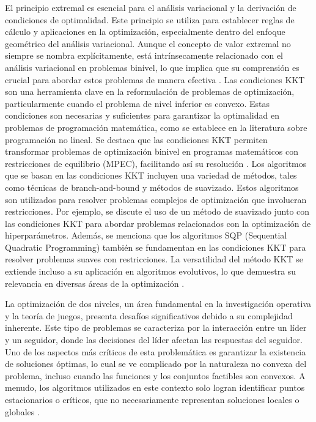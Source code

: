 El principio extremal es esencial para el análisis variacional y la derivación de condiciones de optimalidad. Este principio se utiliza para establecer reglas de cálculo y aplicaciones en la optimización, especialmente dentro del enfoque geométrico del análisis variacional. Aunque el concepto de valor extremal no siempre se nombra explícitamente, está intrínsecamente relacionado con el análisis variacional en problemas binivel, lo que implica que su comprensión es crucial para abordar estos problemas de manera efectiva \cite{DempeyZemkoho2020}.
Las condiciones KKT son una herramienta clave en la reformulación de problemas de optimización, particularmente cuando el problema de nivel inferior es convexo. Estas condiciones son necesarias y suficientes para garantizar la optimalidad en problemas de programación matemática, como se establece en la literatura sobre programación no lineal. Se destaca que las condiciones KKT permiten transformar problemas de optimización binivel en programas matemáticos con restricciones de equilibrio (MPEC), facilitando así su resolución \cite{DempeyZemkoho2020}.
Los algoritmos que se basan en las condiciones KKT incluyen una variedad de métodos, tales como técnicas de branch-and-bound y métodos de suavizado. Estos algoritmos son utilizados para resolver problemas complejos de optimización que involucran restricciones. Por ejemplo, se discute el uso de un método de suavizado junto con las condiciones KKT para abordar problemas relacionados con la optimización de hiperparámetros. Además, se menciona que los algoritmos SQP (Sequential Quadratic Programming) también se fundamentan en las condiciones KKT para resolver problemas suaves con restricciones. La versatilidad del método KKT se extiende incluso a su aplicación en algoritmos evolutivos, lo que demuestra su relevancia en diversas áreas de la optimización \cite{DempeyZemkoho2020}.

La optimización de dos niveles, un área fundamental en la investigación operativa y la teoría de juegos, presenta desafíos significativos debido a su complejidad inherente. Este tipo de problemas se caracteriza por la interacción entre un líder y un seguidor, donde las decisiones del líder afectan las respuestas del seguidor. Uno de los aspectos más críticos de esta problemática es garantizar la existencia de soluciones óptimas, lo cual se ve complicado por la naturaleza no convexa del problema, incluso cuando las funciones y los conjuntos factibles son convexos. A menudo, los algoritmos utilizados en este contexto solo logran identificar puntos estacionarios o críticos, que no necesariamente representan soluciones locales o globales \cite{DempeyZemkoho2020}.

